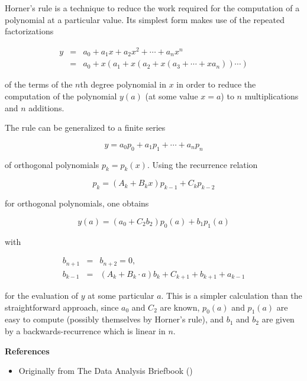 \documentclass{article}
\begin{document}
Horner's rule is a technique to reduce the work required for the computation of a polynomial at a particular value.  Its simplest form makes use of the repeated factorizations 

\begin{eqnarray*} 
 y & = & a_0 + a_1 x + a_2 x^2 + \cdots + a_n x^n \\
   & = & a_0 + x(a_1 + x(a_2 + x(a_3 + \cdots +xa_n)) \cdots ) 
\end{eqnarray*}

of the terms of the $n$th degree polynomial in $x$ in order to reduce the computation of the polynomial $y(a)$ (at some value $x = a$) to $n$ multiplications and $n$ additions.  

The rule can be generalized to a finite series

$$ y = a_0 p_0 + a_1 p_1 + \cdots + a_n p_n $$

of orthogonal polynomials $p_k = p_k(x)$.  Using the recurrence relation

$$ p_k = (A_k + B_k x) p_{k-1} + C_k p_{k-2} $$

for orthogonal polynomials, one obtains 

$$ y(a) = (a_0 + C_2 b_2) p_0(a) + b_1 p_1(a) $$

with 

\begin{eqnarray*}
 b_{n+1} & = & b_{n+2} = 0 , \\
 b_{k-1} & = &  (A_k + B_k\cdot a) b_k + C_{k+1} + b_{k+1} + a_{k-1} 
\end{eqnarray*}

for the evaluation of $y$ at some particular $a$.  This is a simpler calculation than the straightforward approach, since $a_0$ and $C_2$ are known, $p_0(a)$ and $p_1(a)$ are easy to compute (possibly themselves by Horner's rule), and $b_1$ and $b_2$ are given by a backwards-recurrence which is linear in $n$.

{\bf References}

\begin{itemize}
\item Originally from The Data Analysis Briefbook
()
\end{itemize}
\end{document}
